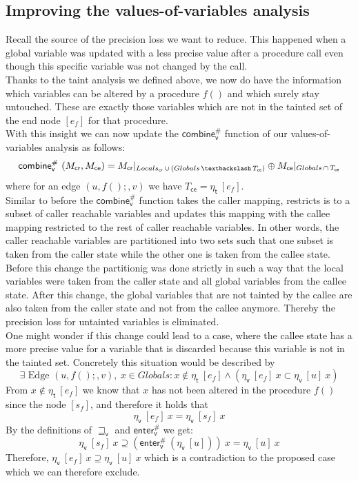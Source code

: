     \subsection{Improving the values-of-variables analysis}
    Recall the source of the precision loss we want to reduce. This happened when a global variable was updated with a less precise value after a procedure call even though this specific variable was not changed by the call.\\
    Thanks to the taint analysis we defined above, we now do have the information which variables can be altered by a procedure $f()$ and which surely stay untouched. These are exactly those variables which are not in the tainted set of the end node $[e_f]$ for that procedure.\\
    With this insight we can now update the $\textsf{combine}^{\#}_\textsf{v}$ function of our values-of-variables analysis as follows:
    \[
      \textsf{combine}^{\#}_\textsf{v}\ (M_\textsf{cr}, M_\textsf{ce}) = M_\textsf{cr}|_{Locals_\textsf{cr}\, \cup\, (Globals\, \textbackslash\, T_\textsf{ce})} \oplus M_\textsf{ce}|_{Globals\, \cap\, T_\textsf{ce}}
    \]
    where for an edge $(u, f();, v)$ we have $T_\textsf{ce} = \eta_\textsf{t}\ [e_f]$.\\
    Similar to before the $\textsf{combine}^{\#}_\textsf{v}$ function takes the caller mapping, restricts is to a subset of caller reachable variables and updates this mapping with the callee mapping restricted to the rest of caller reachable variables. In other words, the caller reachable variables are partitioned into two sets such that one subset is taken from the caller state while the other one is taken from the callee state. Before this change the partitionig was done strictly in such a way that the local variables were taken from the caller state and all global variables from the callee state. After this change, the global variables that are not tainted by the callee are also taken from the caller state and not from the callee anymore. Thereby the precision loss for untainted variables is eliminated.
    \\
    One might wonder if this change could lead to a case, where the callee state has a more precise value for a variable that is discarded because this variable is not in the tainted set. Concretely this situation would be described by 
    \[\exists \text{ Edge }(u, f();, v),\ x \in Globals: x \notin \eta_\textsf{t}\ [e_f] \land (\eta_\textsf{v}\ [e_f]\ x\subset \eta_\textsf{v}\ [u]\ x)\]
    From $x \notin \eta_\textsf{t}\ [e_f]$ we know that $x$ has not been altered in the procedure $f()$ since the node $[s_f]$, and therefore it holds that 
    \[\eta_\textsf{v}\ [e_f]\ x = \eta_\textsf{v}\ [s_f]\ x\]
    By the definitions of $\sqsupseteq_\textsf{v}$ and $\textsf{enter}^{\#}_\textsf{v}$ we get: 
    \[\eta_\textsf{v}\ [s_f]\ x \supseteq (\textsf{enter}^{\#}_\textsf{v}\ (\eta_\textsf{v}\ [u]))\ x = \eta_\textsf{v}\ [u]\ x\]
    Therefore, $\eta_\textsf{v}\ [e_f]\ x\supseteq \eta_\textsf{v}\ [u]\ x$ which is a contradiction to the proposed case which we can therefore exclude.


